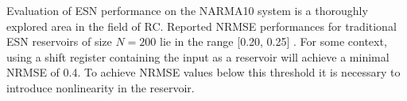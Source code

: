 Evaluation of ESN performance on the NARMA10 system is a thoroughly explored
area in the field of RC. Reported NRMSE performances for traditional ESN
reservoirs of size $N = 200$ lie in the range [0.20, 0.25]
\cite{verstraeten_experimental_2007, rodan_minimum_2011,
goudarzi_comparative_2014, jaeger_adaptive_2003}. For some context, using a
shift register containing the input as a reservoir will achieve a minimal NRMSE
of 0.4. To achieve NRMSE values below this threshold it is necessary to
introduce nonlinearity in the reservoir.

